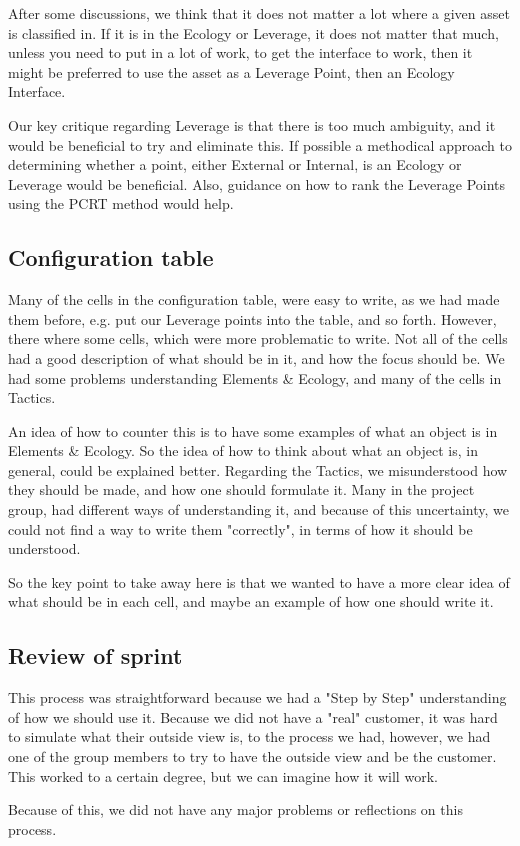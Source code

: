 After some discussions, we think that it does not matter a lot where a given asset is classified in.
If it is in the Ecology or Leverage, it does not matter that much, unless you need to put in a lot of work, to get the interface to work, then it might be preferred to use the asset as a Leverage Point, then an Ecology Interface.

Our key critique regarding Leverage is that there is too much ambiguity, and it would be beneficial to try and eliminate this. 
If possible a methodical approach to determining whether a point, either External or Internal, is an Ecology or Leverage would be beneficial.
Also, guidance on how to rank the Leverage Points using the PCRT method would help.

\subsection{Configuration table}
Many of the cells in the configuration table, were easy to write, as we had made them before, e.g. put our Leverage points into the table, and so forth.
However, there where some cells, which were more problematic to write.
Not all of the cells had a good description of what should be in it, and how the focus should be.
We had some problems understanding Elements \& Ecology, and many of the cells in Tactics.

An idea of how to counter this is to have some examples of what an object is in Elements \& Ecology.
So the idea of how to think about what an object is, in general, could be explained better. 
Regarding the Tactics, we misunderstood how they should be made, and how one should formulate it.
Many in the project group, had different ways of understanding it, and because of this uncertainty, we could not find a way to write them "correctly", in terms of how it should be understood.

So the key point to take away here is that we wanted to have a more clear idea of what should be in each cell, and maybe an example of how one should write it.

\subsection{Review of sprint}
This process was straightforward because we had a "Step by Step" understanding of how we should use it.
Because we did not have a "real" customer, it was hard to simulate what their outside view is, to the process we had, however, we had one of the group members to try to have the outside view and be the customer.
This worked to a certain degree, but we can imagine how it will work.

Because of this, we did not have any major problems or reflections on this process.
